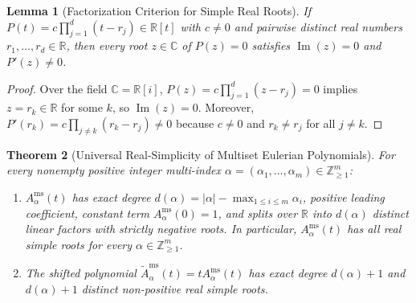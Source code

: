 \documentclass[11pt]{article}
\newtheorem{theorem}{Theorem}[section]
\newtheorem{lemma}[theorem]{Lemma}
\theoremstyle{definition}
\newcommand{\RR}{\mathbb{R}}
\newcommand{\CC}{\mathbb{C}}
\newcommand{\ZZ}{\mathbb{Z}}
\begin{document}
\begin{lemma}[Factorization Criterion for Simple Real Roots]\label{lem:simple-roots}
If $P(t) = c \prod_{j=1}^d (t - r_j) \in \RR[t]$ with $c \neq 0$ and pairwise distinct real
numbers $r_1,\dots,r_d \in \RR$, then every root $z \in \CC$ of $P(z)=0$ satisfies
$\operatorname{Im}(z) = 0$ and $P'(z) \neq 0$.
\end{lemma}

\begin{proof}
Over the field $\CC = \RR[i]$, $P(z) = c \prod_{j=1}^d (z - r_j) = 0$ implies $z = r_k \in \RR$
for some $k$, so $\operatorname{Im}(z) = 0$. Moreover, $P'(r_k) = c \prod_{j \neq k}
(r_k - r_j) \neq 0$ because $c \neq 0$ and $r_k \neq r_j$ for all $j \neq k$.
\end{proof}

\begin{theorem}[Universal Real-Simplicity of Multiset Eulerian Polynomials]\label{thm:universal-ms}
For \emph{every} nonempty positive integer multi-index
$\alpha = (\alpha_1,\dots,\alpha_m) \in \ZZ_{\ge 1}^m$:
\begin{enumerate}
  \item $A_\alpha^{\mathrm{ms}}(t)$ has exact degree $d(\alpha) = |\alpha| - \max_{1\le i\le m}
  \alpha_i$, positive leading coefficient, constant term $A_\alpha^{\mathrm{ms}}(0)=1$, and
  splits over $\RR$ into $d(\alpha)$ distinct linear factors with strictly negative roots.
  In particular, $A_\alpha^{\mathrm{ms}}(t)$ has all real simple roots for \emph{every}
  $\alpha \in \ZZ_{\ge 1}^m$.
  \item The shifted polynomial $\tilde{A}_\alpha^{\mathrm{ms}}(t) = t A_\alpha^{\mathrm{ms}}(t)$
  has exact degree $d(\alpha)+1$ and $d(\alpha)+1$ distinct non-positive real simple roots.
\end{enumerate}
\end{theorem}
\end{document}
